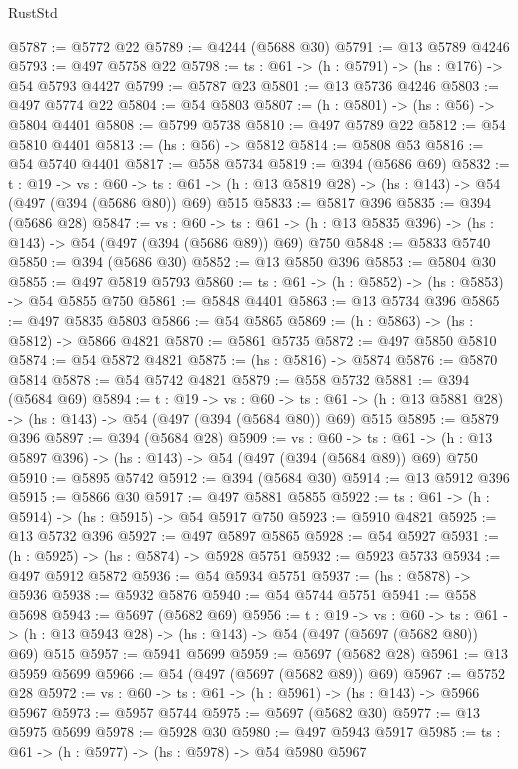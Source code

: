 \begin{lexlean}{RustStd}
\begin{coremodule}
@5787 := @5772 @22
@5789 := @4244 (@5688 @30)
@5791 := @13 @5789 @4246
@5793 := @497 @5758 @22
@5798 := {ts : @61} -> (h : @5791) -> (hs : @176) -> @54 @5793 @4427
@5799 := @5787 @23
@5801 := @13 @5736 @4246
@5803 := @497 @5774 @22
@5804 := @54 @5803
@5807 := (h : @5801) -> (hs : @56) -> @5804 @4401
@5808 := @5799 @5738
@5810 := @497 @5789 @22
@5812 := @54 @5810 @4401
@5813 := (hs : @56) -> @5812
@5814 := @5808 @53
@5816 := @54 @5740 @4401
@5817 := @558 @5734
@5819 := @394 (@5686 @69)
@5832 := {t : @19} ->
  {vs : @60} ->
  {ts : @61} -> (h : @13 @5819 @28) -> (hs : @143) -> @54 (@497 (@394 (@5686 @80)) @69) @515
@5833 := @5817 @396
@5835 := @394 (@5686 @28)
@5847 := {vs : @60} ->
  {ts : @61} -> (h : @13 @5835 @396) -> (hs : @143) -> @54 (@497 (@394 (@5686 @89)) @69) @750
@5848 := @5833 @5740
@5850 := @394 (@5686 @30)
@5852 := @13 @5850 @396
@5853 := @5804 @30
@5855 := @497 @5819 @5793
@5860 := {ts : @61} -> (h : @5852) -> (hs : @5853) -> @54 @5855 @750
@5861 := @5848 @4401
@5863 := @13 @5734 @396
@5865 := @497 @5835 @5803
@5866 := @54 @5865
@5869 := (h : @5863) -> (hs : @5812) -> @5866 @4821
@5870 := @5861 @5735
@5872 := @497 @5850 @5810
@5874 := @54 @5872 @4821
@5875 := (hs : @5816) -> @5874
@5876 := @5870 @5814
@5878 := @54 @5742 @4821
@5879 := @558 @5732
@5881 := @394 (@5684 @69)
@5894 := {t : @19} ->
  {vs : @60} ->
  {ts : @61} -> (h : @13 @5881 @28) -> (hs : @143) -> @54 (@497 (@394 (@5684 @80)) @69) @515
@5895 := @5879 @396
@5897 := @394 (@5684 @28)
@5909 := {vs : @60} ->
  {ts : @61} -> (h : @13 @5897 @396) -> (hs : @143) -> @54 (@497 (@394 (@5684 @89)) @69) @750
@5910 := @5895 @5742
@5912 := @394 (@5684 @30)
@5914 := @13 @5912 @396
@5915 := @5866 @30
@5917 := @497 @5881 @5855
@5922 := {ts : @61} -> (h : @5914) -> (hs : @5915) -> @54 @5917 @750
@5923 := @5910 @4821
@5925 := @13 @5732 @396
@5927 := @497 @5897 @5865
@5928 := @54 @5927
@5931 := (h : @5925) -> (hs : @5874) -> @5928 @5751
@5932 := @5923 @5733
@5934 := @497 @5912 @5872
@5936 := @54 @5934 @5751
@5937 := (hs : @5878) -> @5936
@5938 := @5932 @5876
@5940 := @54 @5744 @5751
@5941 := @558 @5698
@5943 := @5697 (@5682 @69)
@5956 := {t : @19} ->
  {vs : @60} ->
  {ts : @61} -> (h : @13 @5943 @28) -> (hs : @143) -> @54 (@497 (@5697 (@5682 @80)) @69) @515
@5957 := @5941 @5699
@5959 := @5697 (@5682 @28)
@5961 := @13 @5959 @5699
@5966 := @54 (@497 (@5697 (@5682 @89)) @69)
@5967 := @5752 @28
@5972 := {vs : @60} -> {ts : @61} -> (h : @5961) -> (hs : @143) -> @5966 @5967
@5973 := @5957 @5744
@5975 := @5697 (@5682 @30)
@5977 := @13 @5975 @5699
@5978 := @5928 @30
@5980 := @497 @5943 @5917
@5985 := {ts : @61} -> (h : @5977) -> (hs : @5978) -> @54 @5980 @5967

\end{coremodule}
\end{lexlean}
